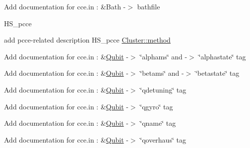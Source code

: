 \begin{DoxyRefList}
Add documentation for cce.\-in \-: \&Bath -\/$>$ bathfile  
\item[\label{todo__todo000013}%
\hypertarget{todo__todo000013}{}%
Member \hyperlink{structCluster_a7c4d583750b7f37eb2ca537e23ad334f}{Cluster\-:\-:s\-K} ]H\-S\-\_\-pcce  
\item[\label{todo__todo000014}%
\hypertarget{todo__todo000014}{}%
Member \hyperlink{structConfig_a73d927bf5bdb0f39d024b23dc66f0c1c}{Config\-:\-:method} \mbox{[}M\-A\-X\-\_\-\-C\-H\-A\-R\-A\-R\-R\-A\-Y\-\_\-\-L\-E\-N\-G\-T\-H\mbox{]}]add pcce-\/related description H\-S\-\_\-pcce \hyperlink{structCluster_acfc81556c4ed78e0bce4c36119fe7150}{Cluster\-::method} 
\item[\label{todo__todo000023}%
\hypertarget{todo__todo000023}{}%
Member \hyperlink{structQubit_accc3b309d802ab6f269b7d8a7536a4a0}{Qubit\-:\-:alpha} ]Add documentation for cce.\-in \-: \&\hyperlink{structQubit}{Qubit} -\/$>$ \char`\"{}alphams\char`\"{} and -\/$>$ \char`\"{}alphastate\char`\"{} tag  
\item[\label{todo__todo000024}%
\hypertarget{todo__todo000024}{}%
Member \hyperlink{structQubit_a6c73eb8c49fdb6db06179b21b5a2923d}{Qubit\-:\-:beta} ]Add documentation for cce.\-in \-: \&\hyperlink{structQubit}{Qubit} -\/$>$ \char`\"{}betams\char`\"{} and -\/$>$ \char`\"{}betastate\char`\"{} tag  
\item[\label{todo__todo000021}%
\hypertarget{todo__todo000021}{}%
Member \hyperlink{structQubit_a6e0e926587994ef24d67431d0dbef9e7}{Qubit\-:\-:detuning} ]Add documentation for cce.\-in \-: \&\hyperlink{structQubit}{Qubit} -\/$>$ \char`\"{}qdetuning\char`\"{} tag  
\item[\label{todo__todo000019}%
\hypertarget{todo__todo000019}{}%
Member \hyperlink{structQubit_a668a62d3ddf72e6b9acbc6338c97090f}{Qubit\-:\-:gyro} ]Add documentation for cce.\-in \-: \&\hyperlink{structQubit}{Qubit} -\/$>$ \char`\"{}qgyro\char`\"{} tag  
\item[\label{todo__todo000017}%
\hypertarget{todo__todo000017}{}%
Member \hyperlink{structQubit_ab65a0dfa0efbd8a7862403f4704c1587}{Qubit\-:\-:name} \mbox{[}M\-A\-X\-\_\-\-C\-H\-A\-R\-A\-R\-R\-A\-Y\-\_\-\-L\-E\-N\-G\-T\-H\mbox{]}]Add documentation for cce.\-in \-: \&\hyperlink{structQubit}{Qubit} -\/$>$ \char`\"{}qname\char`\"{} tag  
\item[\label{todo__todo000022}%
\hypertarget{todo__todo000022}{}%
Member \hyperlink{structQubit_aecb3943042094c4be043f375626dbd24}{Qubit\-:\-:overhaus} ]Add documentation for cce.\-in \-: \&\hyperlink{structQubit}{Qubit} -\/$>$ \char`\"{}qoverhaus\char`\"{} tag  

\end{DoxyRefList}
